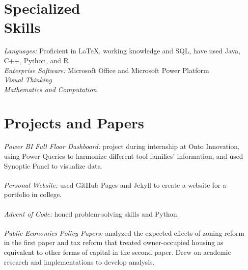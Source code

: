 \documentclass[margin, 12pt]{res} %
\begin{document}
\begin{resume}

\section{\sc Specialized \\ Skills} 

{\sl Languages:} Proficient in \LaTeX, working knowledge and SQL, have used Java, C++, Python, and R\\
{\sl Enterprise Software:} Microsoft Office and Microsoft Power Platform\\
{\sl Visual Thinking}\\
{\sl Mathematics and Computation}

\section{\sc Projects and Papers}
{\sl Power BI Full Floor Dashboard:} project during internship at Onto Innovation, using Power Queries to harmonize different tool families' information, and used Synoptic Panel to visualize data.\\
\vspace{4pt}\\
{\sl Personal Website:} used GitHub Pages and Jekyll to create a website for a portfolio in college.\\
\vspace{4pt}\\
{\sl Advent of Code:} honed problem-solving skills and Python.\\
\vspace{4pt}\\
{\sl Public Economics Policy Papers:} analyzed the expected effects of zoning reform in the first paper and tax reform that treated owner-occupied housing as equivalent to other forms of capital in the second paper. Drew on academic research and implementations to develop analysis.\\
\vspace{4pt}\\

\end{resume}
\end{document}
